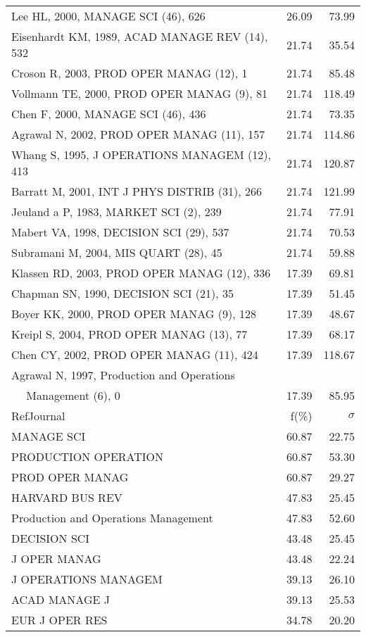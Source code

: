\documentclass[a4paper,11pt]{report}
\begin{document}
\begin{landscape}
\begin{table}[!ht]
{\begin{tabular}{|l r r|}
Lee HL, 2000, MANAGE SCI (46), 626 & 26.09 & 73.99\\
Eisenhardt KM, 1989, ACAD MANAGE REV (14), 532 & 21.74 & 35.54\\
Croson R, 2003, PROD OPER MANAG (12), 1 & 21.74 & 85.48\\
Vollmann TE, 2000, PROD OPER MANAG (9), 81 & 21.74 & 118.49\\
Chen F, 2000, MANAGE SCI (46), 436 & 21.74 & 73.35\\
Agrawal N, 2002, PROD OPER MANAG (11), 157 & 21.74 & 114.86\\
Whang S, 1995, J OPERATIONS MANAGEM (12), 413 & 21.74 & 120.87\\
Barratt M, 2001, INT J PHYS DISTRIB (31), 266 & 21.74 & 121.99\\
Jeuland a P, 1983, MARKET SCI (2), 239 & 21.74 & 77.91\\
Mabert VA, 1998, DECISION SCI (29), 537 & 21.74 & 70.53\\
Subramani M, 2004, MIS QUART (28), 45 & 21.74 & 59.88\\
Klassen RD, 2003, PROD OPER MANAG (12), 336 & 17.39 & 69.81\\
Chapman SN, 1990, DECISION SCI (21), 35 & 17.39 & 51.45\\
Boyer KK, 2000, PROD OPER MANAG (9), 128 & 17.39 & 48.67\\
Kreipl S, 2004, PROD OPER MANAG (13), 77 & 17.39 & 68.17\\
Chen CY, 2002, PROD OPER MANAG (11), 424 & 17.39 & 118.67\\
Agrawal N, 1997, Production and Operations &  & \\
$\quad$ Management (6), 0 & 17.39 & 85.95\\
\hline
\hline
RefJournal & f(\%) & $\sigma$\\
\hline
MANAGE SCI & 60.87 & 22.75\\
PRODUCTION OPERATION & 60.87 & 53.30\\
PROD OPER MANAG & 60.87 & 29.27\\
HARVARD BUS REV & 47.83 & 25.45\\
Production and Operations Management & 47.83 & 52.60\\
DECISION SCI & 43.48 & 25.45\\
J OPER MANAG & 43.48 & 22.24\\
J OPERATIONS MANAGEM & 39.13 & 26.10\\
ACAD MANAGE J & 39.13 & 25.53\\
EUR J OPER RES & 34.78 & 20.20\\
\hline
\end{tabular}
}
\end{table}


\end{landscape}
\end{document}
